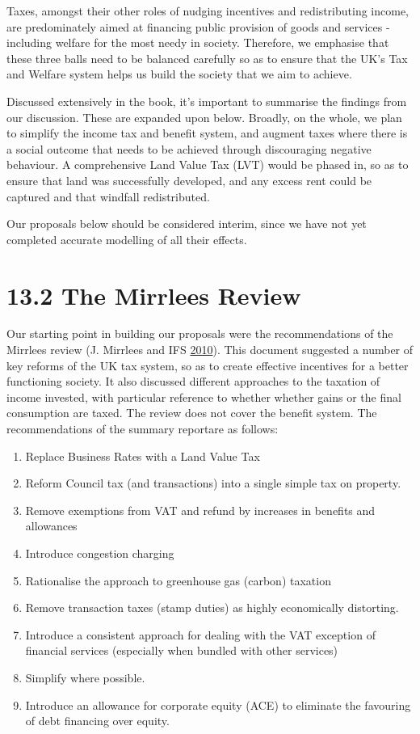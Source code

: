 \documentclass[]{tufte-handout}
\providecommand{\tightlist}{%
  \setlength{\itemsep}{0pt}\setlength{\parskip}{0pt}}
\begin{document}
Taxes, amongst their other roles of nudging incentives and
redistributing income, are predominately aimed at financing public
provision of goods and services - including welfare for the most needy
in society. Therefore, we emphasise that these three balls need to be
balanced carefully so as to ensure that the UK's Tax and Welfare system
helps us build the society that we aim to achieve.

Discussed extensively in the book, it's important to summarise the
findings from our discussion. These are expanded upon below. Broadly, on
the whole, we plan to simplify the income tax and benefit system, and
augment taxes where there is a social outcome that needs to be achieved
through discouraging negative behaviour. A comprehensive Land Value Tax
(LVT) would be phased in, so as to ensure that land was successfully
developed, and any excess rent could be captured and that windfall
redistributed.

Our proposals below should be considered interim, since we have not yet
completed accurate modelling of all their effects.

\hypertarget{the-mirrlees-review}{%
\section{13.2 The Mirrlees Review}\label{the-mirrlees-review}}

Our starting point in building our proposals were the recommendations of
the Mirrlees review (J. Mirrlees and IFS
\protect\hyperlink{ref-Mirrlees2010}{2010}). This document suggested a
number of key reforms of the UK tax system, so as to create effective
incentives for a better functioning society. It also discussed different
approaches to the taxation of income invested, with particular reference
to whether whether gains or the final consumption are taxed. The review
does not cover the benefit system. The recommendations of the summary
reportare as follows:

\begin{enumerate}
\def\labelenumi{\arabic{enumi}.}
\tightlist
\item
  Replace Business Rates with a Land Value Tax
\item
  Reform Council tax (and transactions) into a single simple tax on
  property.
\item
  Remove exemptions from VAT and refund by increases in benefits and
  allowances
\item
  Introduce congestion charging
\item
  Rationalise the approach to greenhouse gas (carbon) taxation
\item
  Remove transaction taxes (stamp duties) as highly economically
  distorting.
\item
  Introduce a consistent approach for dealing with the VAT exception of
  financial services (especially when bundled with other services)
\item
  Simplify where possible.
\item
  Introduce an allowance for corporate equity (ACE) to eliminate the
  favouring of debt financing over equity.
\end{enumerate}
\end{document}
